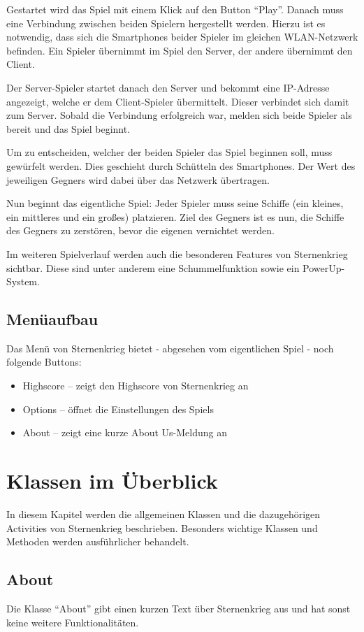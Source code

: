 \documentclass[11pt]{article} %
\begin{document}
Gestartet wird das Spiel mit einem Klick auf den Button \enquote{Play}. Danach muss eine Verbindung zwischen beiden Spielern hergestellt werden. Hierzu ist es notwendig, dass sich die Smartphones beider Spieler im gleichen WLAN-Netzwerk befinden. Ein Spieler übernimmt im Spiel den Server, der andere übernimmt den Client.

Der Server-Spieler startet danach den Server und bekommt eine IP-Adresse angezeigt, welche er dem Client-Spieler übermittelt. Dieser verbindet sich damit zum Server. Sobald die Verbindung erfolgreich war, melden sich beide Spieler als bereit und das Spiel beginnt.

Um zu entscheiden, welcher der beiden Spieler das Spiel beginnen soll, muss gewürfelt werden. Dies geschieht durch Schütteln des Smartphones. Der Wert des jeweiligen Gegners wird dabei über das Netzwerk übertragen.

Nun beginnt das eigentliche Spiel: Jeder Spieler muss seine Schiffe (ein kleines, ein mittleres und ein großes) platzieren. Ziel des Gegners ist es nun, die Schiffe des Gegners zu zerstören, bevor die eigenen vernichtet werden.

Im weiteren Spielverlauf werden auch die besonderen Features von Sternenkrieg sichtbar. Diese sind unter anderem eine Schummelfunktion sowie ein PowerUp-System.

\subsection{Menüaufbau}
Das Menü von Sternenkrieg bietet - abgesehen vom eigentlichen Spiel - noch folgende Buttons:
\begin{itemize}
\item Highscore -- zeigt den Highscore von Sternenkrieg an
\item Options -- öffnet die Einstellungen des Spiels
\item About -- zeigt eine kurze About Us-Meldung an
\end{itemize}


\section{Klassen im Überblick}
In diesem Kapitel werden die allgemeinen Klassen und die dazugehörigen Activities von Sternenkrieg beschrieben. Besonders wichtige Klassen und Methoden werden ausführlicher behandelt.

\subsection{About}
Die Klasse \enquote{About} gibt einen kurzen Text über Sternenkrieg aus und hat sonst keine weitere Funktionalitäten.
\end{document}
